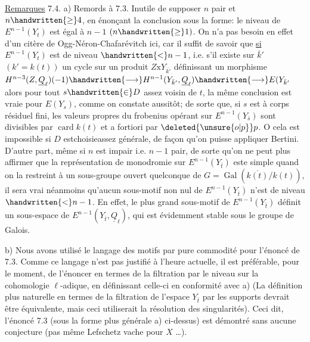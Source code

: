 \uline{Remarques} 7.4. a) Remords à 7.3. Inutile de supposer $n$ pair et $n\handwritten{\geq}4$, en énonçant la conclusion sous la forme: le niveau de $E^{n-1}(Y_t)$ est égal à $n-1$ $(n\handwritten{\geq}1)$. On n'a pas besoin en effet d'un citère de Ogg-Néron-Chafarévitch ici, car il suffit de savoir que \uline{si} $E^{n-1}(Y_t)$ est de niveau $\handwritten{<}n-1$, i.e. s'il existe sur  $\bar{k}'$ $(k'=k(t))$ un cycle sur un produit $Z\mathbin{\mathrm{x}}Y_{\overline{k'}}$ définissant un morphisme $H^{n-3}(Z,\underline{Q}_{\ell})(-1)\handwritten{\longrightarrow}H^{n-1}(Y_{\bar{k}'},\underline{Q}_{\ell})\handwritten{\longrightarrow}E(Y_{\bar{k}'}$  alors pour tout $s\handwritten{\in}D$ assez voisin de $t$, la même conclusion est vraie pour $E(Y_s)$, comme on constate aussitôt; de sorte que, si $s$ est à corps résiduel fini, les valeurs propres du frobenius opérant sur $E^{n-1}(Y_{\bar{s}})$ sont divisibles par  $\operatorname{card}k(t)$ et a fortiori par $\deleted{\unsure{o|p}}p$. O cela est impossible si $D$ estchoisieassez générale, de façon qu'on puisse appliquer Bertini. D'autre part, même si $n$ est impair i.e. $n-1$ pair, de sorte qu'on ne peut plus affirmer que la  représentation de monodromie sur $E^{n-1}(Y_{\bar t})$ este simple quand on la restreint à un sous-groupe ouvert quelconque de $G=\operatorname{Gal}(\overline{k(t)}/k(t))$, il sera vrai néanmoins qu'aucun sous-motif non nul de $E^{n-1}(Y_{\bar t})$ n'est de niveau $\handwritten{<}n-1$. En effet, le plus grand sous-motif  de $E^{n-1}(Y_{\bar t})$  définit un sous-espace de $E^{n-1}(Y_{\bar t},\underline{Q}_{\ell})$, qui est évidemment stable sous le groupe de Galois.

b) Nous avons utilisé le langage des motifs par pure commodité pour l'énoncé de 7.3. Comme ce langage n'est pas justifié à l'heure actuelle, il est préférable, pour le moment, de l'énoncer en termes de la filtration par le niveau sur la cohomologie $\ell$-adique, en définissant celle-ci en conformité avec a) (La définition plus naturelle en termes de la filtration de l'espace $Y_{\bar t}$ par les supports devrait être équivalente, mais ceci utiliserait la résolution des singularités). Ceci dit, l'énoncé 7.3 (sous la forme plus générale a) ci-dessus) est démontré sans aucune conjecture (pas même Lefschetz vache pour $X$ \ldots).

